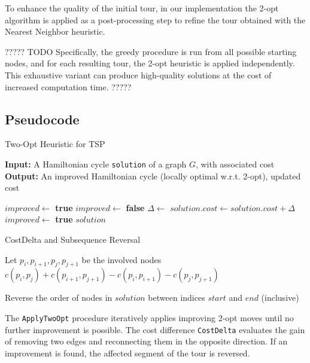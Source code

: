 To enhance the quality of the initial tour, in our implementation the 2-opt algorithm is applied as a post-processing step to refine the tour obtained 
with the Nearest Neighbor heuristic. 

????? TODO
Specifically, the greedy procedure is run from all possible starting nodes, and for each resulting tour, 
the 2-opt heuristic is applied independently. This exhaustive variant can produce high-quality solutions at the cost of increased computation time. 
?????

\subsection{Pseudocode}

\begin{algorithm}
\caption{Two-Opt Heuristic for TSP}
\label{alg:twoopt}
\textbf{Input:} A Hamiltonian cycle \texttt{solution} of a graph $G$, with associated cost\\
\textbf{Output:} An improved Hamiltonian cycle (locally optimal w.r.t. 2-opt), updated cost
\begin{algorithmic}
    \State $improved \gets$ \textbf{true}
        \State $improved \gets$ \textbf{false}
                \State $\Delta \gets$ 
                    \State {}
                    \State $solution.cost \gets solution.cost + \Delta$
                    \State $improved \gets$ \textbf{true}
                \EndIf
            \EndFor
        \EndFor
    \EndWhile
    \State \Return $solution$
\EndProcedure
\end{algorithmic}
\end{algorithm}

\begin{algorithm}
\caption{CostDelta and Subsequence Reversal}
\label{alg:subroutines}
\begin{algorithmic}
    \State Let $p_i, p_{i+1}, p_j, p_{j+1}$ be the involved nodes
    \State \Return $c(p_i, p_j) + c(p_{i+1}, p_{j+1}) - c(p_i, p_{i+1}) - c(p_j, p_{j+1})$
\EndFunction

    \State Reverse the order of nodes in $solution$ between indices $start$ and $end$ (inclusive)
\EndProcedure
\end{algorithmic}
\end{algorithm}

The \texttt{ApplyTwoOpt} procedure iteratively applies improving 2-opt moves until no further improvement is possible. 
The cost difference \texttt{CostDelta} evaluates the gain of removing two edges and reconnecting them in the opposite direction. 
If an improvement is found, the affected segment of the tour is reversed.

